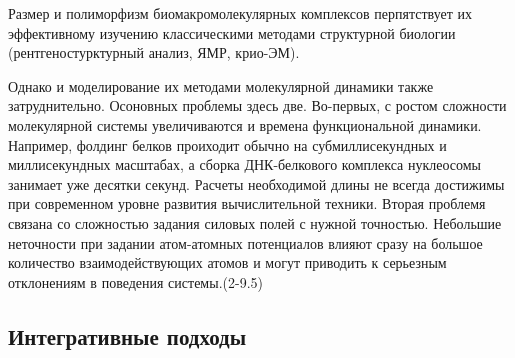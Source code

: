 \begin{frame}
{{Размер и полиморфизм биомакромолекулярных комплексов перпятствует их эффективному изучению классическими методами структурной биологии (рентгеностурктурный анализ, ЯМР, крио-ЭМ).

Однако и моделирование их методами молекулярной динамики также затруднительно.
Осоновных проблемы здесь две. Во-первых, с ростом сложности молекулярной системы увеличиваются и времена функциональной динамики. Например, фолдинг белков проиходит обычно на субмиллисекундных и миллисекундных масштабах, а сборка ДНК-белкового комплекса нуклеосомы занимает уже десятки секунд. Расчеты необходимой длины не всегда достижимы при современном уровне развития вычислительной техники.
Вторая проблемя связана со сложностью задания силовых полей с нужной точностью. Небольшие неточности при задании атом-атомных потенциалов влияют сразу на большое количество взаимодействующих атомов и могут приводить к серьезным отклонениям в поведения системы.(2-9.5)

}}
\end{frame}



\subsection{Интегративные подходы}

